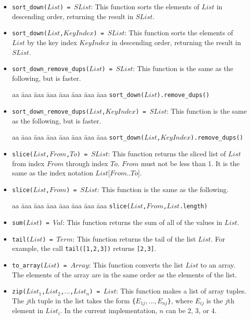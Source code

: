 \begin{itemize}
\item \texttt{sort\_down($List$) = $SList$}: This function sorts the elements of $List$ in descending order, returning the result in $SList$.

\item \texttt{sort\_down($List$,$KeyIndex$) = $SList$}: This function sorts the elements of $List$ by the key index $KeyIndex$ in descending order, returning the result in $SList$.

\item \texttt{sort\_down\_remove\_dups($List$) = $SList$}: This function is the same as the following, but is faster.
\begin{tabbing}
aa \= aaa \= aaa \= aaa \=aaa \= aaa \= aaa \= aaa \kill
\> \texttt{sort\_down($List$).remove\_dups()}
\end{tabbing}

\item \texttt{sort\_down\_remove\_dups($List$,$KeyIndex$) = $SList$}: This function is the same as the following, but is faster.
\begin{tabbing}
aa \= aaa \= aaa \= aaa \=aaa \= aaa \= aaa \= aaa \kill
\> \texttt{sort\_down($List$,$KeyIndex$).remove\_dups()}
\end{tabbing}

\item \texttt{slice($List$,$From$,$To$) = $SList$}: This function returns the sliced list of $List$ from index $From$ through index $To$. $From$ must not be less than 1. It is the same as the index notation $List$[$From$..$To$].

\item \texttt{slice($List$,$From$) = $SList$}: This function is the same as the following.
\begin{tabbing}
aa \= aaa \= aaa \= aaa \=aaa \= aaa \= aaa \= aaa \kill
\> \texttt{slice($List$,$From$,$List$.length)}
\end{tabbing}

\item \texttt{sum($List$) = $Val$}: This function returns the sum of all of the values in $List$. 
\item \texttt{tail($List$) = $Term$}: This function returns the tail of the list $List$.  For example, the call \texttt{tail([1,2,3])} returns \texttt{[2,3]}.
\item \texttt{to\_array($List$) = $Array$}: This function converts the list $List$ to an array.  The elements of the array are in the same order as the elements of the list.
\item \texttt{zip($List_1$,$List_2$,$\ldots$,$List_n$) = $List$}: This function makes a list of array tuples.  The $j$th tuple in the list takes the form \texttt{\{$E_{1j},\ldots,E_{nj}$\}}, where $E_{ij}$ is the $j$th element in $List_i$. In the current implementation, $n$ can be 2, 3, or 4.

\end{itemize}

